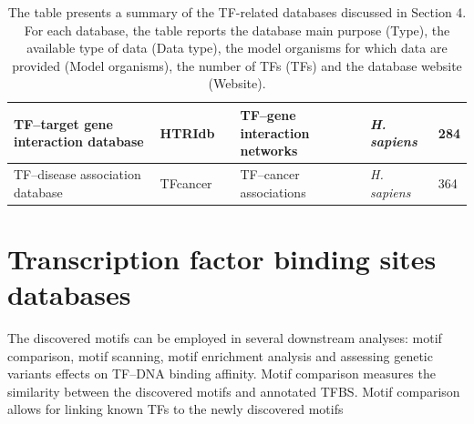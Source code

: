 \documentclass[a4paper, titlepage, openright]{book}
\begin{document}
\begin{table}
\begin{tabular}{|p{2cm}|p{2cm}|p{3cm}|p{2cm}|p{4cm}|p{2cm}|}
		\hline
		TF–target gene interaction database  & HTRIdb & \citep{bovolenta2012htridb} & TF–gene interaction networks & \emph{H. sapiens} & 284 \\
		\hline
		TF–disease association database  & TFcancer & \citep{huang2021tfcancer} & TF–cancer associations & \emph{H. sapiens} & 364 \\
		\hline
	\end{tabular}
	\caption[Transcription factor-related databases.]{The table presents a summary of the TF-related databases discussed in Section 4. For each database, the table reports the database main purpose (Type), the available type of data (Data type), the model organisms for which data are provided (Model organisms), the number of TFs (TFs) and the database website (Website).}
	\label{table:tfdbs}
\end{table}

\section{Transcription factor binding sites databases}
The discovered motifs can be employed in several downstream analyses: motif comparison, motif scanning, motif enrichment analysis and assessing genetic variants effects on TF–DNA binding affinity. Motif comparison measures the similarity between the discovered motifs and annotated TFBS. Motif comparison allows for linking known TFs to the newly discovered motifs \citep{gupta2007quantifying}
\end{document}
